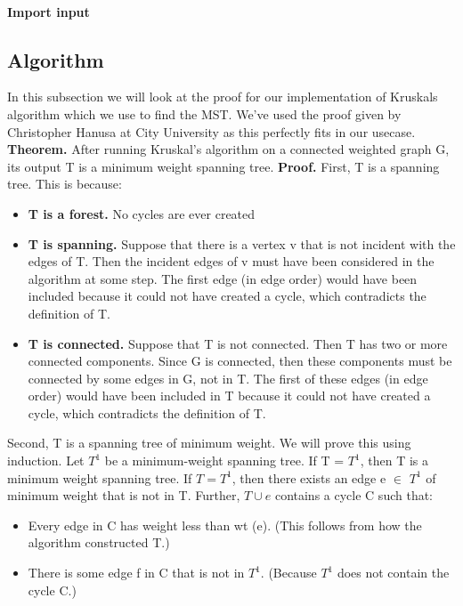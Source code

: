 \documentclass{article}
\begin{document}
\paragraph{Import input}
\subsection{Algorithm}
In this subsection we will look at the proof for our implementation of Kruskals algorithm which we use to find the MST. We've used the proof given by Christopher Hanusa at City University as this perfectly fits in our usecase.
\newline
\newline
\textbf{Theorem.} After running Kruskal’s algorithm on a connected weighted graph G, its output T is a
minimum weight spanning tree.
\newline
\newline
\textbf{Proof.} First, T is a spanning tree. This is because:
\begin{itemize}
  \item \textbf{T is a forest.} No cycles are ever created
  \item \textbf{T is spanning.} Suppose that there is a vertex v that is not incident with the edges of T.
Then the incident edges of v must have been considered in the algorithm at some step. The
first edge (in edge order) would have been included because it could not have created a cycle,
which contradicts the definition of T.
  \item \textbf{T is connected.} Suppose that T is not connected. Then T has two or more connected
components. Since G is connected, then these components must be connected by some edges
in G, not in T. The first of these edges (in edge order) would have been included in T because
it could not have created a cycle, which contradicts the definition of T.
\end{itemize}
Second, T is a spanning tree of minimum weight. We will prove this using induction. Let $T^1$ be a
minimum-weight spanning tree. If T = $T^1$, then T is a minimum weight spanning tree. If $T = T^1$,
then there exists an edge e $\in$ $T^1$ of minimum weight that is not in T. Further, $T \cup e$ contains a
cycle C such that:
\begin{itemize}
  \item Every edge in C has weight less than wt (e). (This follows from how the algorithm constructed
T.)
  \item There is some edge f in C that is not in $T^1$. (Because $T^1$ does not contain the cycle C.)
\end{itemize}
\end{document}
